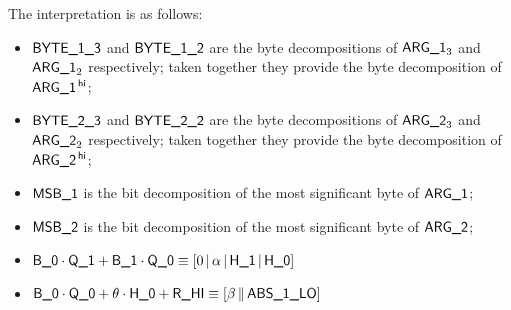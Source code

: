 \noindent The interpretation is as follows:
\begin{itemize}
	\item $\textsf{BYTE}\textsf{\_1\_3}$ and $\textsf{BYTE}\textsf{\_1\_2}$ are the byte decompositions of $\textsf{ARG}\textsf{\_1}_{3}$ and $\textsf{ARG}\textsf{\_1}_{2}$ respectively; taken together they provide the byte decomposition of $\textsf{ARG}\textsf{\_1}^{\mathsf{\,hi}}$; 
	\item $\textsf{BYTE}\textsf{\_2\_3}$ and $\textsf{BYTE}\textsf{\_2\_2}$ are the byte decompositions of $\textsf{ARG}\textsf{\_2}_{3}$ and $\textsf{ARG}\textsf{\_2}_{2}$ respectively; taken together they provide the byte decomposition of $\textsf{ARG}\textsf{\_2}^{\mathsf{\,hi}}$; 
	\item $\textsf{MSB\_1}$ is the bit decomposition of the most significant byte of $\textsf{ARG}\textsf{\_1}$;
	\item $\textsf{MSB\_2}$ is the bit decomposition of the most significant byte of $\textsf{ARG}\textsf{\_2}$;
	\item $\textsf{B\_0} \cdot \textsf{Q\_1} + \textsf{B\_1} \cdot \textsf{Q\_0} \equiv [0 \,|\, \alpha \,|\, \textsf{H\_1} \,|\, \textsf{H\_0}]$
	\item $\textsf{B\_0} \cdot \textsf{Q\_0}  + \theta \cdot \textsf{H\_0} + \textsf{R\_HI} \equiv [\beta \,\|\, \textsf{ABS}\textsf{\_1}\textsf{\_LO} ]$
\end{itemize}
